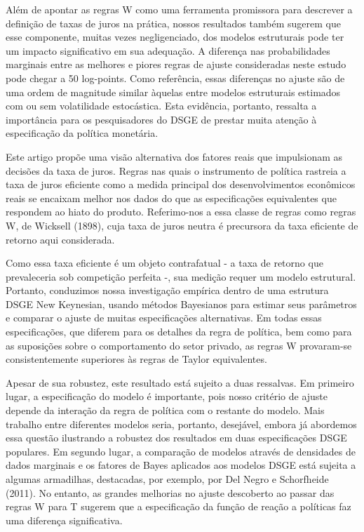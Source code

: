 \documentclass[11pt,oneside,a4paper]{article}
\begin{document}
Além de apontar as regras W como uma ferramenta promissora para descrever a definição de taxas de juros na prática, nossos resultados também sugerem que esse componente, muitas vezes negligenciado, dos modelos estruturais pode ter um impacto significativo em sua adequação. A diferença nas probabilidades marginais entre as melhores e piores regras de ajuste consideradas neste estudo pode chegar a 50 log-points. Como referência, essas diferenças no ajuste são de uma ordem de magnitude similar àquelas entre modelos estruturais estimados com ou sem volatilidade estocástica. Esta evidência, portanto, ressalta a importância para os pesquisadores do DSGE de prestar muita atenção à especificação da política monetária.

Este artigo propõe uma visão alternativa dos fatores reais que impulsionam as decisões da taxa de juros. Regras nas quais o instrumento de política rastreia a taxa de juros eficiente como a medida principal dos desenvolvimentos econômicos reais se encaixam melhor nos dados do que as especificações equivalentes que respondem ao hiato do produto. Referimo-nos a essa classe de regras como regras W, de Wicksell (1898), cuja taxa de juros neutra é precursora da taxa eficiente de retorno aqui considerada.

Como essa taxa eficiente é um objeto contrafatual - a taxa de retorno que prevaleceria sob competição perfeita -, sua medição requer um modelo estrutural. Portanto, conduzimos nossa investigação empírica dentro de uma estrutura DSGE New Keynesian, usando métodos Bayesianos para estimar seus parâmetros e comparar o ajuste de muitas especificações alternativas. Em todas essas especificações, que diferem para os detalhes da regra de política, bem como para as suposições sobre o comportamento do setor privado, as regras W provaram-se consistentemente superiores às regras de Taylor equivalentes.

Apesar de sua robustez, este resultado está sujeito a duas ressalvas. Em primeiro lugar, a especificação do modelo é importante, pois nosso critério de ajuste depende da interação da regra de política com o restante do modelo. Mais trabalho entre diferentes modelos seria, portanto, desejável, embora já abordemos essa questão ilustrando a robustez dos resultados em duas especificações DSGE populares. Em segundo lugar, a comparação de modelos através de densidades de dados marginais e os fatores de Bayes aplicados aos modelos DSGE está sujeita a algumas armadilhas, destacadas, por exemplo, por Del Negro e Schorfheide (2011). No entanto, as grandes melhorias no ajuste descoberto ao passar das regras W para T sugerem que a especificação da função de reação a políticas faz uma diferença significativa.
\end{document}

